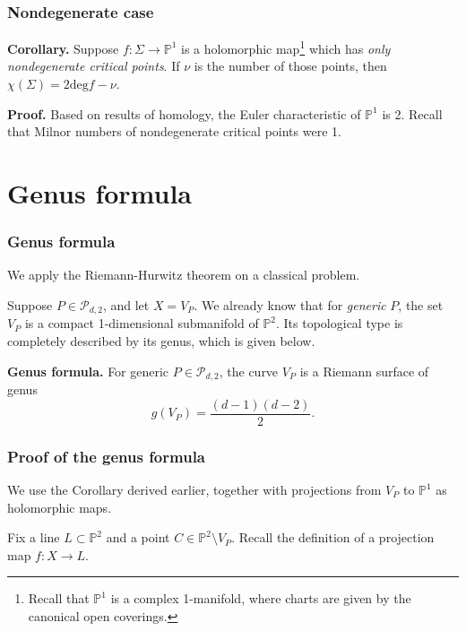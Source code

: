 \documentclass{beamer}
\begin{document}
\begin{frame}
\frametitle{Nondegenerate case}

\textbf{Corollary.} Suppose $f : \Sigma \to \mathbb{P}^1$ is a holomorphic map\footnote{Recall that $\mathbb{P}^1$ is a complex 1-manifold, where charts are given by the canonical open coverings.} which has \textit{only nondegenerate critical points}. If $\nu$ is the number of those points, then $\chi(\Sigma) = 2\text{deg}f - \nu$.

\phantom{?}

\textbf{Proof.} Based on results of homology, the Euler characteristic of $\mathbb{P}^1$ is 2. Recall that Milnor numbers of nondegenerate critical points were 1.

\end{frame}


\section{Genus formula}

\begin{frame}
\frametitle{Genus formula}

We apply the Riemann-Hurwitz theorem on a classical problem.

\phantom{?}

Suppose $P \in \mathcal{P}_{d,2}$, and let $X = V_P$. We already know that for \textit{generic} $P$, the set $V_P$ is a compact 1-dimensional submanifold of $\mathbb{P}^2$. Its topological type is completely described by its genus, which is given below.

\phantom{?}

\textbf{Genus formula.} For generic $P \in \mathcal{P}_{d,2}$, the curve $V_P$ is a Riemann surface of genus \[g(V_P) = \frac{(d-1)(d-2)}{2}.\]

\end{frame}


\begin{frame}
\frametitle{Proof of the genus formula}

We use the Corollary derived earlier, together with projections from $V_P$ to $\mathbb{P}^1$ as holomorphic maps.

\phantom{?}

Fix a line $L \subset \mathbb{P}^2$ and a point $C \in \mathbb{P}^2\setminus V_P$. Recall the definition of a projection map $f: X \to L$. 

\end{frame}
\end{document}

